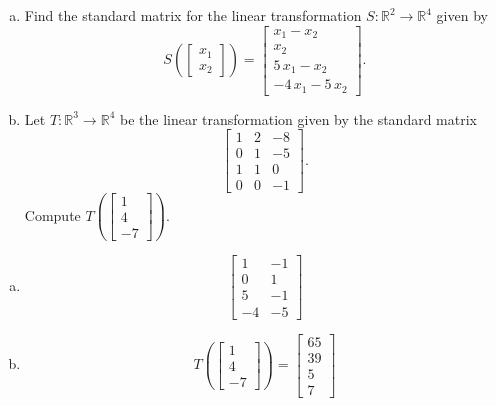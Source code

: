 
\begin{exerciseStatement}

\begin{enumerate}[(a)]
\item Find the standard matrix for the linear transformation \(S:\mathbb{R}^ 2  \to \mathbb{R}^ 4 \) given by \[S\left(  \left[\begin{array}{c}
x_{1} \\
x_{2}
\end{array}\right]  \right) =  \left[\begin{array}{c}
x_{1} - x_{2} \\
x_{2} \\
5 \, x_{1} - x_{2} \\
-4 \, x_{1} - 5 \, x_{2}
\end{array}\right] .\]
\item Let \(T:\mathbb{R}^ 3  \to \mathbb{R}^ 4 \) be the linear transformation given by the standard matrix \[ \left[\begin{array}{ccc}
1 & 2 & -8 \\
0 & 1 & -5 \\
1 & 1 & 0 \\
0 & 0 & -1
\end{array}\right] .\] Compute \(T\left( \left[\begin{array}{c}
1 \\
4 \\
-7
\end{array}\right]  \right)\). 
\end{enumerate}
    
\end{exerciseStatement}
    
\begin{exerciseAnswer} 

\begin{enumerate}[(a)]
\item \[ \left[\begin{array}{cc}
1 & -1 \\
0 & 1 \\
5 & -1 \\
-4 & -5
\end{array}\right] \]
\item \[T\left( \left[\begin{array}{c}
1 \\
4 \\
-7
\end{array}\right]  \right)= \left[\begin{array}{c}
65 \\
39 \\
5 \\
7
\end{array}\right] \]
\end{enumerate}
    
\end{exerciseAnswer}
    
